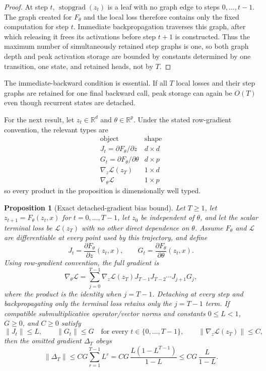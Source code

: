\documentclass[11pt,oneside]{book}
\newtheorem{proposition}[definition]{Proposition}
\theoremstyle{remark}
\begin{document}
\begin{proof}
At step $t$, $\operatorname{stopgrad}(z_t)$ is a leaf with no graph edge to
steps $0,\ldots,t-1$. The graph created for $F_\theta$ and the local loss
therefore contains only the fixed computation for step $t$. Immediate
backpropagation traverses this graph, after which releasing it frees its
activations before step $t+1$ is constructed. Thus the maximum number of
simultaneously retained step graphs is one, so both graph depth and peak
activation storage are bounded by constants determined by one transition,
one state, and retained heads, not by $T$.
\end{proof}

The immediate-backward condition is essential. If all $T$ local losses and
their step graphs are retained for one final backward call, peak storage can
again be $O(T)$ even though recurrent states are detached.

For the next result, let $z_t\in\mathbb R^d$ and
$\theta\in\mathbb R^p$. Under the stated row-gradient convention, the relevant
types are
\[
\begin{array}{c|c}
\text{object}&\text{shape}\\
\hline
J_t=\partial F_\theta/\partial z&d\times d\\
G_t=\partial F_\theta/\partial\theta&d\times p\\
\nabla_z\mathcal L(z_T)&1\times d\\
\nabla_\theta\mathcal L&1\times p
\end{array}
\]
so every product in the proposition is dimensionally well typed.

\begin{proposition}[Exact detached-gradient bias bound]
Let $T\ge1$, let $z_{t+1}=F_\theta(z_t,x)$ for
$t=0,\ldots,T-1$, let $z_0$ be independent
of $\theta$, and let the scalar terminal loss be $\mathcal L(z_T)$ with no
other direct dependence on $\theta$. Assume $F_\theta$ and $\mathcal L$ are
differentiable at every point used by this trajectory, and define
\[
J_t=\frac{\partial F_\theta}{\partial z}(z_t,x),
\qquad
G_t=\frac{\partial F_\theta}{\partial\theta}(z_t,x).
\]
Using row-gradient convention, the full gradient is
\[
\nabla_\theta\mathcal L
=\sum_{j=0}^{T-1}
\nabla_z\mathcal L(z_T)
J_{T-1}J_{T-2}\cdots J_{j+1}G_j,
\]
where the product is the identity when $j=T-1$. Detaching at every step and
backpropagating only the terminal loss retains only the $j=T-1$ term. If
compatible submultiplicative operator/vector norms and constants
$0\le L<1$, $G\ge0$, and $C\ge0$ satisfy
\[
\|J_t\|\le L,\qquad
\|G_t\|\le G
\quad\text{for every }t\in\{0,\ldots,T-1\},
\qquad
\|\nabla_z\mathcal L(z_T)\|\le C,
\]
then the omitted gradient $\Delta_T$ obeys
\[
\|\Delta_T\|
\le CG\sum_{r=1}^{T-1}L^r
=CG\,\frac{L(1-L^{T-1})}{1-L}
\le CG\,\frac L{1-L}.
\]
\end{proposition}
\end{document}
